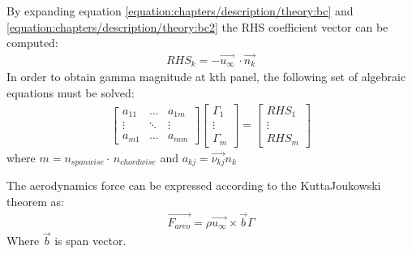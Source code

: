 \documentclass[a4paper,12pt,english]{jupyterBook}
\begin{document}
\sphinxAtStartPar
By expanding equation \eqref{equation:chapters/description/theory:bc} and \eqref{equation:chapters/description/theory:bc2} the RHS coefficient vector can be computed:
\begin{equation*}
\begin{split}
RHS_k=-\overrightarrow{u_{\infty}}\,\cdot\overrightarrow{n_k}
\end{split}
\end{equation*}
\sphinxAtStartPar
In order to obtain gamma magnitude at k\sphinxhyphen{}th panel, the following set of algebraic equations must be solved:
\label{equation:chapters/description/theory:47ff99fa-4b2c-48b1-be9c-762f880dc5d4}\begin{gather}
    \begin{bmatrix} 
    a_{11} & \dots  & a_{1m}\\
    \vdots & \ddots & \vdots\\
    a_{m1} & \dots  & a_{mm}
    \end{bmatrix}
\begin{bmatrix} 
    \Gamma_{1} \\
    \vdots \\
    \Gamma_{m}
    \end{bmatrix}
 =
  \begin{bmatrix} 
    RHS_{1} \\
    \vdots \\
    RHS_{m}
    \end{bmatrix}
\end{gather}
\sphinxAtStartPar
where \(m=n_{spanwise}\cdot\,n_{chordwise}\) and \(a_{kj} = \overrightarrow{\nu_{kj}} n_k\)

\sphinxAtStartPar
The aerodynamics force can be expressed according to the Kutta\sphinxhyphen{}Joukowski theorem as:
\begin{equation*}
\begin{split}
\overrightarrow{F_{areo}} = \rho \overrightarrow{u_{\infty}} \times \overrightarrow{b} \Gamma
\end{split}
\end{equation*}
\sphinxAtStartPar
Where \(\overrightarrow{b}\) is span vector.
\end{document}
